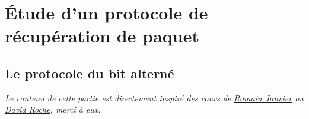 \documentclass[
  11pt,
]{article}
\newcounter{cours}
\begin{document}
\hypertarget{uxe9tude-dun-protocole-de-ruxe9cupuxe9ration-de-paquet}{%
\section{Étude d'un protocole de récupération de
paquet}\label{uxe9tude-dun-protocole-de-ruxe9cupuxe9ration-de-paquet}}

\hypertarget{le-protocole-du-bit-alternuxe9}{%
\subsection{Le protocole du bit
alterné}\label{le-protocole-du-bit-alternuxe9}}

\emph{Le contenu de cette partie est directement inspiré des cours de
\href{http://archives.janviercommelemois.fr/nsi/fichiers_pdf/feuille-internet.pdf}{Romain
Janvier} ou
\href{https://pixees.fr/informatiquelycee/n_site/nsi_prem.html}{David
Roche}, merci à eux.}
\end{document}
